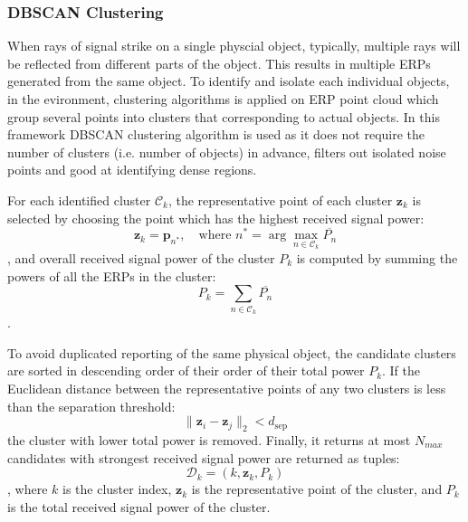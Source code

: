 \subsubsection{DBSCAN Clustering}
\label{subsubsec:dbscan-clustering}

When rays of signal strike on a single physcial object, typically, multiple rays will be reflected from different parts of the object.
This results in multiple ERPs generated from the same object.
To identify and isolate each individual objects, in the evironment, clustering algorithms is applied on ERP point cloud which group several points into clusters that corresponding to actual objects.
In this framework DBSCAN clustering algorithm is used as it does not require the number of clusters (i.e. number of objects) in advance, filters out isolated noise points and good at identifying dense regions.

For each identified cluster $\mathcal{C}_k$, the representative point of each cluster $\mathbf{z}_k$ is selected by choosing the point which has the highest received signal power:
\begin{equation}
    \mathbf{z}_k = \mathbf{p}_{n^\ast}, \quad \text{where } n^\ast = \arg\max_{n\in\mathcal{C}_k} \overline{P_n}
\end{equation}, and overall received signal power of the cluster $P_k$ is computed by summing the powers of all the ERPs in the cluster:
\begin{equation}
    P_k = \sum_{n\in\mathcal{C}_k} \overline{P_n}
\end{equation}.

To avoid duplicated reporting of the same physical object, the candidate clusters are sorted in descending order of their order of their total power $P_k$.
If the Euclidean distance between the representative points of any two clusters is less than the separation threshold:
\begin{equation}
    \|\mathbf{z}_i - \mathbf{z}_j\|_2 < d_{\mathrm{sep}}
\end{equation}
the cluster with lower total power is removed.
Finally, it returns at most $N_{max}$ candidates with strongest received signal power are returned as tuples:
\begin{equation}
    \mathcal{D}_k = (k, \mathbf{z}_k, P_k)
\end{equation},
where $k$ is the cluster index, $\mathbf{z}_k$ is the representative point of the cluster, and $P_k$ is the total received signal power of the cluster.